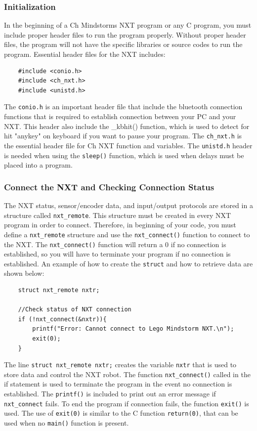 \documentclass[12pt]{article}
\begin{document}
\subsubsection{Initialization}
In the beginning of a Ch Mindstorms NXT program or any C program, you must include proper header 
files to run the program properly. Without proper header files, the program will not have the specific 
libraries or source codes to run the program. Essential header files for the NXT includes:
\newline
\\
\begin{verbatim}
    #include <conio.h>
    #include <ch_nxt.h>
    #include <unistd.h>
\end{verbatim}
\noindent
The \verb+conio.h+ is an important header file that include the bluetooth connection functions 
that is required to establish connection between your PC and your NXT. This header also include 
the \_kbhit() function, which is used to detect for hit "anykey" on keyboard if you want to pause 
your program. The \verb+ch_nxt.h+ is the essential header file for Ch NXT function and variables.  
The \verb+unistd.h+ header is needed when using the \verb+sleep()+ function, which is used when 
delays must be placed into a program.
\newline
\\
\subsubsection{Connect the NXT and Checking Connection Status}
The NXT status, sensor/encoder data, and input/output protocols are stored in a structure called \verb+nxt_remote+. 
This structure must be created in every NXT program in order to connect. Therefore, in beginning of your code, 
you must define a \verb+nxt_remote+ structure and use the \verb+nxt_connect()+ function to connect to the NXT. 
The \verb+nxt_connect()+ function will return a 0 if no connection is established, so you will have to terminate 
your program if no connection is established. An example of how to create the \verb+struct+ and how to retrieve 
data are shown below:
\begin{verbatim}
    struct nxt_remote nxtr;

    //Check status of NXT connection
    if (!nxt_connect(&nxtr)){
        printf("Error: Cannot connect to Lego Mindstorm NXT.\n");
        exit(0);
    }

\end{verbatim}
The line \verb+struct nxt_remote nxtr;+ creates the variable \verb+nxtr+ that is used to store data and control the 
NXT robot. The function \verb+nxt_connect()+ called in the if statement is used to terminate the program in 
the event no connection is established. The \verb+printf()+ is included to print out an error message if 
\verb+nxt_connect+ fails. To end the program if connection fails, the function \verb+exit()+ 
is used. The use of \verb+exit(0)+ is similar to the C function \verb+return(0)+, that can be used when no 
\verb+main()+ function is present.
\newline
\\
\end{document}
